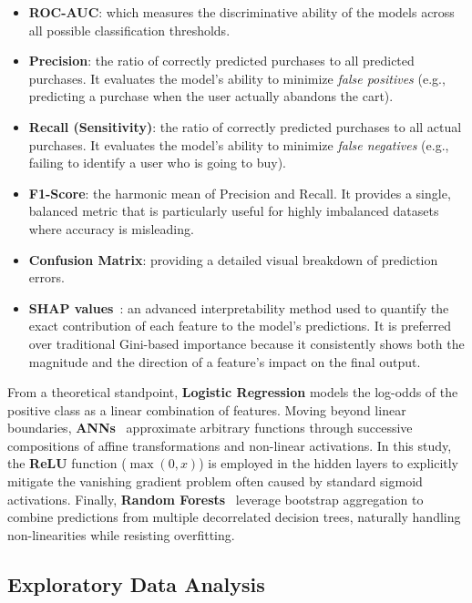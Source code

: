 \begin{itemize}
    \item \textbf{ROC-AUC}: which measures the discriminative ability of the models across all possible classification thresholds.
    \item \textbf{Precision}: the ratio of correctly predicted purchases to all predicted purchases. It evaluates the model's ability to minimize \textit{false positives} (e.g., predicting a purchase when the user actually abandons the cart).
    \item \textbf{Recall (Sensitivity)}: the ratio of correctly predicted purchases to all actual purchases. It evaluates the model's ability to minimize \textit{false negatives} (e.g., failing to identify a user who is going to buy).
    \item \textbf{F1-Score}: the harmonic mean of Precision and Recall. It provides a single, balanced metric that is particularly useful for highly imbalanced datasets where accuracy is misleading.
    \item \textbf{Confusion Matrix}: providing a detailed visual breakdown of prediction errors.
    \item \textbf{SHAP values}~\cite{lundberg2017}: an advanced interpretability method used to quantify the exact contribution of each feature to the model's predictions. It is preferred over traditional Gini-based importance because it consistently shows both the magnitude and the direction of a feature's impact on the final output.
\end{itemize}

From a theoretical standpoint, \textbf{Logistic Regression} models the log-odds of the positive class as a linear combination of features. Moving beyond linear boundaries, \textbf{ANNs}~\cite{goodfellow2016} approximate arbitrary functions through successive compositions of affine transformations and non-linear activations. In this study, the \textbf{ReLU} function ($\max(0, x)$) is employed in the hidden layers to explicitly mitigate the vanishing gradient problem often caused by standard sigmoid activations. Finally, \textbf{Random Forests}~\cite{breiman2001} leverage bootstrap aggregation to combine predictions from multiple decorrelated decision trees, naturally handling non-linearities while resisting overfitting.

\subsection{Exploratory Data Analysis}

